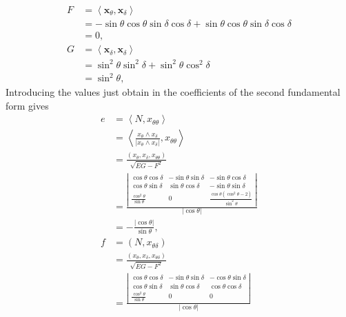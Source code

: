\documentclass[a4paper]{article}
\numberwithin{equation}{section}
\begin{document}
\begin{enumerate}
\begin{align}
F& = \left\langle {{\mathbf{x}_\theta },{\mathbf{x}_\delta }} \right\rangle \\
& =  - \sin \theta \cos \theta \sin \delta \cos \delta  + \sin \theta \cos \theta \sin \delta \cos \delta \\
& = 0,\\
G& = \left\langle {{\mathbf{x}_\delta },{\mathbf{x}_\delta }} \right\rangle \\
 &= {\sin ^2}\theta {\sin ^2}\delta  + {\sin ^2}\theta {\cos ^2}\delta \\
 &= {\sin ^2}\theta ,
\end{align}
Introducing the values just obtain in the coefficients of the second fundamental form gives
\begin{align}
e &= \left\langle {N,{x_{\theta \theta }}} \right\rangle \\
 &= \left\langle {\frac{{{x_\theta } \wedge {x_\delta }}}{{\left| {{x_\theta } \wedge {x_\delta }} \right|}},{x_{\theta \theta }}} \right\rangle \\
& = \frac{{\left( {{x_\theta },{x_\delta },{x_{\theta \theta }}} \right)}}{{\sqrt {EG - {F^2}} }}\\
& = \frac{{\left| {\begin{array}{*{20}{c}}
{\cos \theta \cos \delta }&{ - \sin \theta \sin \delta }&{ - \sin \theta \cos \delta }\\
{\cos \theta \sin \delta }&{\sin \theta \cos \delta }&{ - \sin \theta \sin \delta }\\
{\frac{{{{\cos }^2}\theta }}{{\sin \theta }}}&0&{\frac{{\cos \theta \left( {{{\cos }^2}\theta  - 2} \right)}}{{{{\sin }^2}\theta }}}
\end{array}} \right|}}{{\left| {\cos \theta } \right|}}\\
 &=  - \frac{{\left| {\cos \theta } \right|}}{{\sin \theta }},\\
f &= \left( {N,{x_{\theta \delta }}} \right)\\
& = \frac{{\left( {{x_\theta },{x_\delta },{x_{\theta \delta }}} \right)}}{{\sqrt {EG - {F^2}} }}\\
& = \frac{{\left| {\begin{array}{*{20}{c}}
{\cos \theta \cos \delta }&{ - \sin \theta \sin \delta }&{ - \cos \theta \sin \delta }\\
{\cos \theta \sin \delta }&{\sin \theta \cos \delta }&{\cos \theta \cos \delta }\\
{\frac{{{{\cos }^2}\theta }}{{\sin \theta }}}&0&0
\end{array}} \right|}}{{\left| {\cos \theta } \right|}}\\

\end{align}
\end{enumerate}
\end{document}
